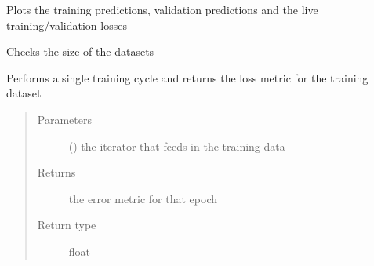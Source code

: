 \documentclass[letterpaper,10pt,english]{sphinxmanual}
\begin{document}
\begin{fulllineitems}
\begin{fulllineitems}
\end{fulllineitems}


\begin{fulllineitems}
\label{\detokenize{index:Src.deeplearning.DeepLearning.live_pred_plot}}
Plots the training predictions, validation predictions
and the live training/validation losses

\end{fulllineitems}


\begin{fulllineitems}
\label{\detokenize{index:Src.deeplearning.DeepLearning.size_check}}
Checks the size of the datasets

\end{fulllineitems}


\begin{fulllineitems}
\label{\detokenize{index:Src.deeplearning.DeepLearning.train}}
Performs a single training cycle and returns the
loss metric for the training dataset
\begin{quote}\begin{description}
\item[{Parameters}] \leavevmode
{} () \textendash{} the iterator that feeds in the training data

\item[{Returns}] \leavevmode
the error metric for that epoch

\item[{Return type}] \leavevmode
float

\end{description}\end{quote}


\end{fulllineitems}
\end{fulllineitems}
\end{document}
